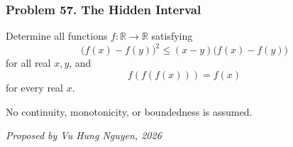 \subsubsection*{Problem 57. The Hidden Interval}

\begin{exercisebox}[medium]

Determine all functions $f:\mathbb R\to\mathbb R$ satisfying
\[
\boxed{\qquad
\bigl(f(x)-f(y)\bigr)^2
\le (x-y)\bigl(f(x)-f(y)\bigr)
\qquad} \tag{1}
\]
for all real $x,y$, and
\[
\boxed{\qquad
f(f(f(x)))=f(x)
\qquad} \tag{2}
\]
for every real $x$.

No continuity, monotonicity, or boundedness is assumed.

\begin{flushright}
\textit{Proposed by Vu Hung Nguyen, 2026}
\end{flushright}


\end{exercisebox}
